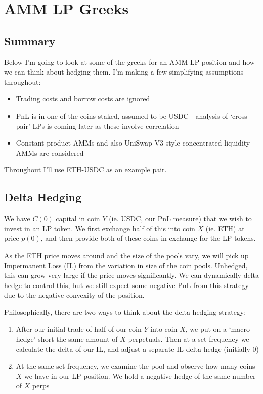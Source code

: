 \documentclass{article}
\begin{document}
\section*{AMM LP Greeks}

\subsection*{Summary}

Below I'm going to look at some of the greeks for an AMM LP position and how we can think about hedging them. I'm making a few simplifying assumptions throughout:

\begin{itemize}
\item Trading costs and borrow costs are ignored
\item PnL is in one of the coins staked, assumed to be USDC - analysis of `cross-pair' LPs is coming later as these involve correlation
\item Constant-product AMMs and also UniSwap V3 style concentrated liquidity AMMs are considered
\end{itemize}

Throughout I'll use ETH-USDC as an example pair.

\subsection*{Delta Hedging}
\label{sec:delta}

We have $C(0)$ capital in coin $Y$ (ie. USDC, our PnL measure) that we wish to invest in an LP token. We first exchange half of this into coin $X$ (ie. ETH) at price $p(0)$, and then provide both of these coins in exchange for the LP tokens.

As the ETH price moves around and the size of the pools vary, we will pick up Impermanent Loss (IL) from the variation in size of the coin pools. Unhedged, this can grow very large if the price moves significantly. We can dynamically delta hedge to control this, but we still expect some negative PnL from this strategy due to the negative convexity of the position.

Philosophically, there are two ways to think about the delta hedging strategy:
\begin{enumerate}
\item After our initial trade of half of our coin $Y$ into coin $X$, we put on a `macro hedge' short the same amount of $X$ perpetuals. Then at a set frequency we calculate the delta of our IL, and adjust a separate IL delta hedge (initially 0)
\item At the same set frequency, we examine the pool and observe how many coins $X$ we have in our LP position. We hold a negative hedge of the same number of $X$ perps 
\end{enumerate}
\end{document}
